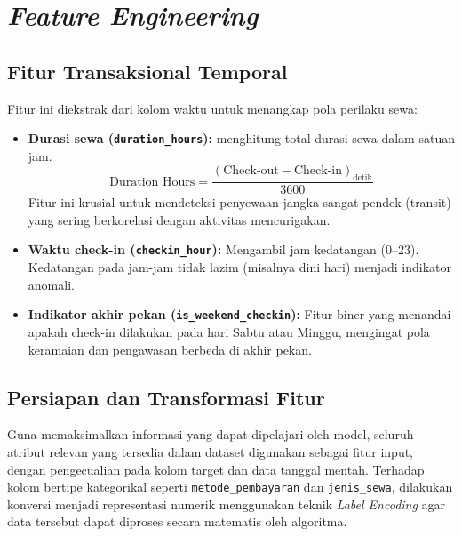 \section{\textit{Feature Engineering}}

\subsection{Fitur Transaksional Temporal}
Fitur ini diekstrak dari kolom waktu untuk menangkap pola perilaku sewa:
\begin{itemize}
    \item \textbf{Durasi sewa (\texttt{duration\_hours}):} menghitung total durasi sewa dalam satuan jam. 
    \[
    \text{Duration Hours} = \frac{(\text{Check-out} - \text{Check-in})_{\text{detik}}}{3600}
    \]
    Fitur ini krusial untuk mendeteksi penyewaan jangka sangat pendek (transit) yang sering berkorelasi dengan aktivitas mencurigakan.
    
    \item \textbf{Waktu check-in (\texttt{checkin\_hour}):} Mengambil jam kedatangan (0--23). Kedatangan pada jam-jam tidak lazim (misalnya dini hari) menjadi indikator anomali.
    
    \item \textbf{Indikator akhir pekan (\texttt{is\_weekend\_checkin}):} Fitur biner yang menandai apakah check-in dilakukan pada hari Sabtu atau Minggu, mengingat pola keramaian dan pengawasan berbeda di akhir pekan.
\end{itemize}

\subsection{Persiapan dan Transformasi Fitur}
Guna memaksimalkan informasi yang dapat dipelajari oleh model, seluruh atribut relevan yang tersedia dalam dataset digunakan sebagai fitur input, dengan pengecualian pada kolom target dan data tanggal mentah. Terhadap kolom bertipe kategorikal seperti \texttt{metode\_pembayaran} dan \texttt{jenis\_sewa}, dilakukan konversi menjadi representasi numerik menggunakan teknik \textit{Label Encoding} agar data tersebut dapat diproses secara matematis oleh algoritma.
